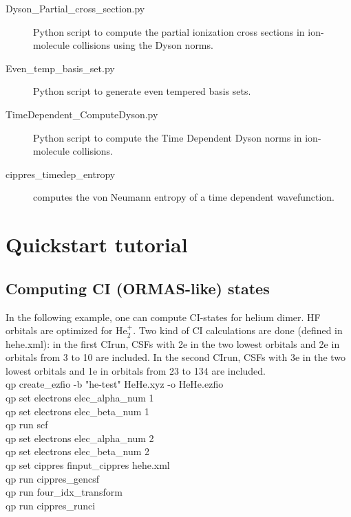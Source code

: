 \documentclass[a4paper, 10 pt]{report}
\begin{document}
\begin{description}
    \item[Dyson\_Partial\_cross\_section.py] Python script to compute the partial ionization cross sections in ion-molecule collisions using the Dyson norms. 
    \item[Even\_temp\_basis\_set.py] Python script to generate even tempered basis sets. 
    \item[TimeDependent\_ComputeDyson.py] Python script to compute the Time Dependent Dyson norms in ion-molecule collisions. 
    \item[cippres\_timedep\_entropy] computes the von Neumann entropy of a time dependent wavefunction.
          
\end{description}

\newpage

\chapter{Quickstart tutorial}

\section{Computing CI (ORMAS-like) states}

In the following example, one can compute CI-states for helium dimer. HF orbitals are optimized for He$_2^+$. Two kind of CI calculations are done (defined in hehe.xml): in the first CIrun, CSFs with 2e in the two lowest orbitals and 2e in orbitals from 3 to 10 are included. In the second CIrun, CSFs with 3e in the two lowest orbitals and 1e in orbitals from 23 to 134 are included.\\

\noindent qp create\_ezfio -b "he-test" HeHe.xyz -o HeHe.ezfio\\
qp set electrons elec\_alpha\_num 1\\
qp set electrons elec\_beta\_num 1 \\
qp run scf\\
qp set electrons elec\_alpha\_num 2\\
qp set electrons elec\_beta\_num 2 \\
qp set cippres finput\_cippres hehe.xml\\
qp run cippres\_gencsf\\
qp run four\_idx\_transform\\
qp run cippres\_runci\\
\end{document}

